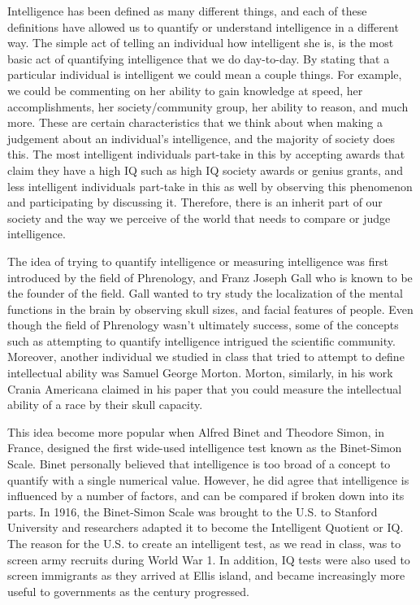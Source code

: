 \documentclass[11pt, oneside]{article}
\begin{document}
\par Intelligence has been defined as many different things, and each of these definitions have allowed us to quantify or understand intelligence in a different way. The simple act of telling an individual how intelligent she is, is the most basic act of quantifying intelligence that we do day-to-day. By stating that a particular individual is intelligent we could mean a couple things. For example, we could be commenting on her ability to gain knowledge at speed, her accomplishments, her society/community group, her ability to reason, and much more. 
These are certain characteristics that we think about when making a judgement about an individual's intelligence, and the majority of society does this. The most intelligent individuals part-take in this by accepting awards that claim they have a high IQ such as high IQ society awards or genius grants, and less intelligent individuals part-take in this as well by observing this phenomenon and participating by discussing it. Therefore, there is an inherit part of our society and the way we perceive of the world that needs to compare or judge intelligence.

\par The idea of trying to quantify intelligence or measuring intelligence was first introduced by the field of Phrenology, and Franz Joseph Gall who is known to be the founder of the field. Gall wanted to try study the localization of the mental functions in the brain by observing skull sizes, and facial features of people. Even though the field of Phrenology wasn't ultimately success, some of the concepts such as attempting to quantify intelligence intrigued the scientific community. Moreover, another individual we studied in class that tried to attempt to define intellectual ability was Samuel George Morton. Morton, similarly, in his work Crania Americana claimed in his paper that you could measure the intellectual ability of a race by their skull capacity. 

\par This idea become more popular when Alfred Binet and Theodore Simon, in France, designed the first wide-used intelligence test known as the Binet-Simon Scale. Binet personally believed that intelligence is too broad of a concept to quantify with a single numerical value. However, he did agree that intelligence is influenced by a number of factors, and can be compared if broken down into its parts. In 1916, the Binet-Simon Scale was brought to the U.S. to Stanford University and researchers adapted it to become the Intelligent Quotient or IQ. The reason for the U.S. to create an intelligent test, as we read in class, was to screen army recruits during World War 1. In addition, IQ tests were also used to screen immigrants as they arrived at Ellis island, and became increasingly more useful to governments as the century progressed. 
\end{document}
